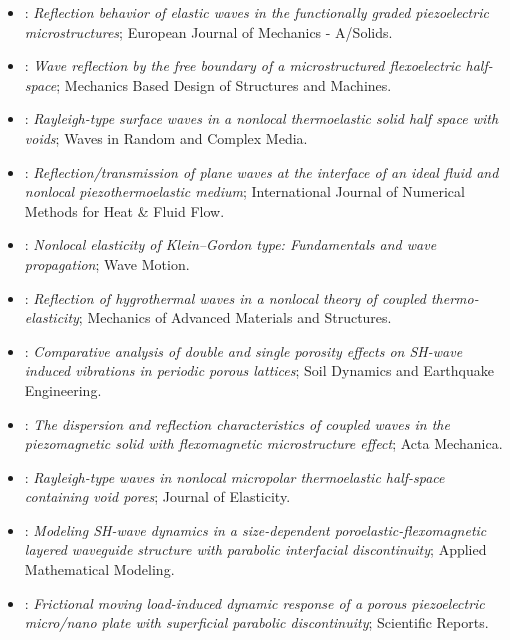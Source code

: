 \begin{itemize}
\item \citet{Liu2020}: \emph{Reflection behavior of elastic waves in the functionally graded piezoelectric microstructures}; European Journal of Mechanics - A/Solids.
\item \citet{Singh2020c}: \emph{Wave reflection by the free boundary of a microstructured flexoelectric half-space}; Mechanics Based Design of Structures and Machines.
\item \citet{Singh2020e}: \emph{Rayleigh-type surface waves in a nonlocal thermoelastic solid half space with voids}; Waves in Random and Complex Media.
\item \citet{Gupta2023IJNMF}: \emph{Reflection/transmission of plane waves at the interface of an ideal fluid and nonlocal piezothermoelastic medium}; International Journal of Numerical Methods for Heat \& Fluid Flow.
\item \citet{Lazar2022}: \emph{Nonlocal elasticity of Klein–Gordon type: Fundamentals and wave propagation}; Wave Motion.
\item \citet{Yadav2022}: \emph{Reflection of hygrothermal waves in a nonlocal theory of coupled thermo-elasticity}; Mechanics of Advanced Materials and Structures.
\item \citet{Dutta2024}: \emph{Comparative analysis of double and single porosity effects on SH-wave induced vibrations in periodic porous lattices}; Soil Dynamics and Earthquake Engineering.
\item \citet{Jiao2024}: \emph{The dispersion and reflection characteristics of coupled waves in the piezomagnetic solid with flexomagnetic microstructure effect}; Acta Mechanica.
\item \citet{Kumar2024b}: \emph{Rayleigh-type waves in nonlocal micropolar thermoelastic half-space containing void pores}; Journal of Elasticity.
\item \citet{Gupta2026}: \emph{Modeling SH-wave dynamics in a size-dependent poroelastic-flexomagnetic layered waveguide structure with parabolic interfacial discontinuity}; Applied Mathematical Modeling.
\item \citet{Meghana2026a}: \emph{Frictional moving load-induced dynamic response of a porous piezoelectric micro/nano plate with superficial parabolic discontinuity}; Scientific Reports.
\end{itemize}
